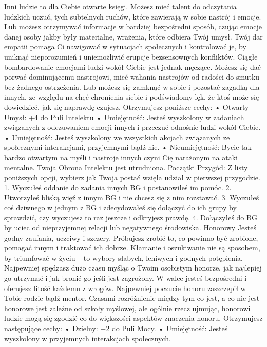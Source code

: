 Inni ludzie to dla Ciebie otwarte księgi. Możesz mieć talent do odczytania ludzkich uczuć, tych subtelnych ruchów, które zawierają w sobie nastrój i emocje. Lub możesz otrzymywać informacje w bardziej bezpośredni sposób, czując emocje danej osoby jakby były materialne, wrażenia, które odbiera Twój umysł. Twój dar empatii pomaga Ci nawigować w sytuacjach społecznych i kontrolować je, by uniknąć nieporozumień i uniemożliwić erupcje bezsensownych konfliktów. 
Ciągłe bombardowanie emocjami ludzi wokół Ciebie jest jednak męczące. Możesz się dać porwać dominującemu nastrojowi, mieć wahania nastrojów od radości do smutku bez żadnego ostrzeżenia. Lub możesz się zamknąć w sobie i pozostać zagadką dla innych, ze względu na chęć chronienia siebie i podświadomy lęk, że ktoś może się dowiedzieć, jak się naprawdę czujesz.
Otrzymujesz poniższe cechy:
    • Otwarty Umysł: +4 do Puli Intelektu
    • Umiejętność: Jesteś wyszkolony w zadaniach związanych z odczuwaniem emocji innych i przeczuć odnośnie ludzi wokół Ciebie.
    • Umiejętność: Jesteś wyszkolony we wszystkich akcjach związanych ze społecznymi interakcjami, przyjemnymi bądź nie.
    • Nieumiejętność: Bycie tak bardzo otwartym na myśli i nastroje innych czyni Cię narażonym na ataki mentalne. Twoja Obrona Intelektu jest utrudniona.
Początki Przygód: Z listy poniższych opcji, wybierz jak Twoja postać wzięła udział w pierwszej przygodzie.
1. Wyczułeś oddanie do zadania innych BG i postanowiłeś im pomóc.
2. Utworzyłeś bliską więź z innym BG i nie chcesz się z nim rozstawać.
3. Wyczułeś coś dziwnego w jednym z BG i zdecydowałeś się dołączyć do ich grupy by sprawdzić, czy wyczujesz to raz jeszcze i odkryjesz prawdę.
4. Dołączyłeś do BG by uciec od nieprzyjemnej relacji lub negatywnego środowiska. 
Honorowy
Jesteś godny zaufania, uczciwy i szczery. Próbujesz zrobić to, co powinno być zrobione, pomagać innym i traktować ich dobrze. Kłamanie i oszukiwanie nie są sposobem, by triumfować w życiu – to wybory słabych, leniwych i godnych potępienia. Najpewniej spędzasz dużo czasu myśląc o Twoim osobistym honorze, jak najlepiej go utrzymać i jak bronić go jeśli jest zagrożony. W walce jesteś bezpośredni i oferujesz litość każdemu z wrogów.
Najpewniej poczucie honoru zaszczepił w Tobie rodzic bądź mentor. Czasami rozróżnienie między tym co jest, a co nie jest honorowe jest zależne od szkoły myślowej, ale ogólnie rzecz ujmując, honorowi ludzie mogą się zgodzić co do większości aspektów znaczenia honoru.
Otrzymujesz następujące cechy:
    • Dzielny: +2 do Puli Mocy.
    • Umiejętność: Jesteś wyszkolony w przyjemnych interakcjach społecznych.
